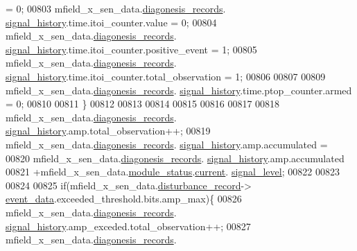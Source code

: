\begin{DoxyCode}
                                     = 0;
00803                  mfield\_x\_sen\_data.\hyperlink{a00025_a2bd79ce84bbd6b7f50d38954f7ae475e}{diagonesis\_records}.
      \hyperlink{a00019_ab7038f4de1f77b52a7f89e9f77c0b846}{signal\_history}.time.itoi\_counter.value              = 0;
00804                  mfield\_x\_sen\_data.\hyperlink{a00025_a2bd79ce84bbd6b7f50d38954f7ae475e}{diagonesis\_records}.
      \hyperlink{a00019_ab7038f4de1f77b52a7f89e9f77c0b846}{signal\_history}.time.itoi\_counter.positive\_event     = 1;
00805                  mfield\_x\_sen\_data.\hyperlink{a00025_a2bd79ce84bbd6b7f50d38954f7ae475e}{diagonesis\_records}.
      \hyperlink{a00019_ab7038f4de1f77b52a7f89e9f77c0b846}{signal\_history}.time.itoi\_counter.total\_observation  = 1;
00806 
00807 
00809                  mfield\_x\_sen\_data.\hyperlink{a00025_a2bd79ce84bbd6b7f50d38954f7ae475e}{diagonesis\_records}.
      \hyperlink{a00019_ab7038f4de1f77b52a7f89e9f77c0b846}{signal\_history}.time.ptop\_counter.armed              = 0;
00810 
00811          \}
00812 
00813 
00814 
00815 
00816 
00817 
00818              mfield\_x\_sen\_data.\hyperlink{a00025_a2bd79ce84bbd6b7f50d38954f7ae475e}{diagonesis\_records}.
      \hyperlink{a00019_ab7038f4de1f77b52a7f89e9f77c0b846}{signal\_history}.amp.total\_observation++;
00819              mfield\_x\_sen\_data.\hyperlink{a00025_a2bd79ce84bbd6b7f50d38954f7ae475e}{diagonesis\_records}.
      \hyperlink{a00019_ab7038f4de1f77b52a7f89e9f77c0b846}{signal\_history}.amp.accumulated =
00820                      mfield\_x\_sen\_data.\hyperlink{a00025_a2bd79ce84bbd6b7f50d38954f7ae475e}{diagonesis\_records}.
      \hyperlink{a00019_ab7038f4de1f77b52a7f89e9f77c0b846}{signal\_history}.amp.accumulated
00821                      +mfield\_x\_sen\_data.\hyperlink{a00025_adfab5a5d8b45a93dfb13edb24e2b80e3}{module\_status}.\hyperlink{a00019_acf41ffc11da291c2f9f0fcb02ee72b98}{current}.
      \hyperlink{a00019_a4070db8eab0ff93e3fbc1df59872f117}{signal\_level};
00822 
00823 
00824 
00825              \textcolor{keywordflow}{if}(mfield\_x\_sen\_data.\hyperlink{a00025_ac9b38e2c1d3f1013a88d33506c754152}{disturbance\_record}->
      \hyperlink{a00028_a8c0bda69e71ef674e60da47ad0be9ab0}{event\_data}.exceeded\_threshold.bits.amp\_max)\{
00826                     mfield\_x\_sen\_data.\hyperlink{a00025_a2bd79ce84bbd6b7f50d38954f7ae475e}{diagonesis\_records}.
      \hyperlink{a00019_ab7038f4de1f77b52a7f89e9f77c0b846}{signal\_history}.amp\_exceded.total\_observation++;
00827                     mfield\_x\_sen\_data.\hyperlink{a00025_a2bd79ce84bbd6b7f50d38954f7ae475e}{diagonesis\_records}.

\end{DoxyCode}
